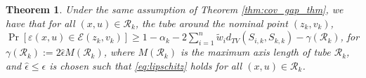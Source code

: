 \documentclass[10pt,a4paper]{amsart}
\newtheorem{theorem}{Theorem}
\begin{document}
\begin{theorem}\label{thm:tube_gap}
Under the same assumption of Theorem \ref{thm:cov_gap_thm}, we have that for all $(x,u) \in \mathcal{R}_k$, the tube around the nominal point $(z_k,v_k)$, 
    $\Pr[\varepsilon(x,u) \in \mathcal{E}(z_k,v_k)] \geq 1-\alpha_k- 2\sum_{i=1}^{n} \tilde{w}_i d_{TV}(S_{i,k}, S_{k,k})- \gamma({\mathcal{R}_k})$,
for $ \gamma({\mathcal{R}_k}) := 2\hat{\epsilon}M(\mathcal{R}_k) $, where $M(\mathcal{R}_k)$ is the maximum axis length of tube $\mathcal{R}_k$, and $\hat \epsilon \le \epsilon$ is chosen such that \eqref{eq:lipschitz} holds for all $(x, u) \in \mathcal{R}_k$.%
\end{theorem}
\end{document}
